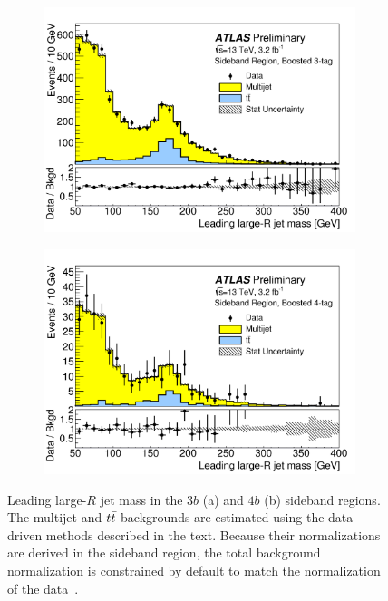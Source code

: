 \begin{figure}[h!]
  \centering
  \captionsetup{justification=centering}

   \begin{subfigure}[t]{0.5\textwidth}
        \centering
        \includegraphics[width=\textwidth]{figures/3b_sideband}
        \caption{}
    \end{subfigure}%
    \begin{subfigure}[t]{0.5\textwidth}
        \centering
        \includegraphics[width=\textwidth]{figures/4b_sideband}
        \caption{}
    \end{subfigure}

   \caption{Leading large-$R$ jet mass in the $3b$ (a) and $4b$ (b) sideband regions. The multijet and $t\bar{t}$ backgrounds are estimated using the data-driven methods described in the text. Because their normalizations are derived in the sideband region, the total background normalization is constrained by default to match the normalization of the data~\cite{4bconf}.}
  \label{fig:4b_sideband}
\end{figure}

